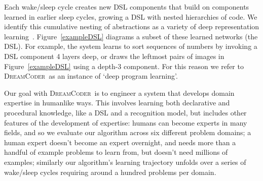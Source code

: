 \documentclass{article}
\newcommand{\system}{\textsc{DreamCoder}~}
\begin{document}

Each wake/sleep cycle creates new DSL components that build on
components learned in earlier sleep cycles, growing a DSL with nested 
hierarchies of code.  We identify this cumulative nesting of
abstractions as a variety of deep representation
learning~\cite{lecun2015deep}.  Figure~\ref{exampleDSL} diagrams a
subset of these learned networks (the DSL). For example, the system
learns to sort sequences of numbers by invoking a DSL component 4
layers deep, or draws the leftmost pairs of images in
Figure~\ref{exampleDSL} using a depth-3 component.  For this reason we
refer to \system as an instance of `deep program learning'.


Our goal with \system is to engineer a system that develops domain
expertise in humanlike ways. This involves learning both declarative and
procedural knowledge, like a DSL and a recognition model, but includes
other features of the development of expertise:
humans can become experts in many fields,
and so we evaluate our algorithm across six different problem domains;
a human expert doesn't become an expert overnight,
and needs more than a handful of example problems to learn from,
but doesn't need millions of examples;
similarly our algorithm's
learning trajectory unfolds over a series of wake/sleep cycles
requiring around a hundred problems per domain.
\end{document}
